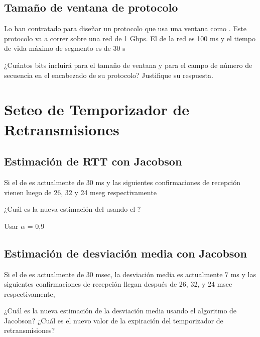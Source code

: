 \documentclass[12pt]{report}
\begin{document}
\begin{exer}
\subsection{Tamaño de ventana de protocolo \sthree}
Lo han contratado para diseñar un protocolo que usa una ventana como . Este
protocolo va a correr sobre una red de 1 Gbps. El  de la red es 100 ms y el tiempo de vida
máximo de segmento es de 30 s

¿Cuántos bits incluirá para el tamaño de ventana y para el campo de
número de secuencia en el encabezado de su protocolo? Justifique su respuesta.

\end{exer}

\section{Seteo de Temporizador de Retransmisiones}

\begin{exer}
\subsection{Estimación de RTT con Jacobson \stwo}

Si el  de  es actualmente de 30 ms y las siguientes confirmaciones de
recepción vienen luego de 26, 32 y 24 mseg respectivamente

¿Cuál es la nueva estimación del  usando el ?

Usar $\alpha$ = 0,9
\end{exer}

\begin{exer}
\subsection{Estimación de desviación media con Jacobson \sthree}
Si el  de  es actualmente de 30 msec, la desviación media es actualmente 7
ms y las siguientes confirmaciones de recepción llegan después de 26, 32, y 24 msec
respectivamente,

¿Cuál es la nueva estimación de la desviación media usando el algoritmo de Jacobson?
¿Cuál es el nuevo valor de la expiración del temporizador de retransmisiones?

\end{exer}
\end{document}
